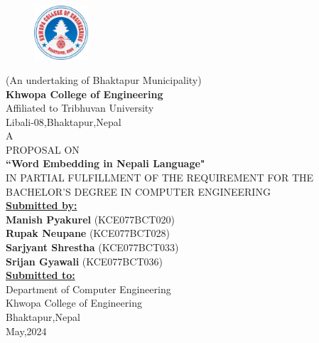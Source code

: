     \begin{center}
		\thispagestyle{empty}
        \begin{figure}[h!]
		    \centering
			    \includegraphics[width=0.18\textwidth]{img/khwopa logo.png}
		\end{figure}
         \normalsize(An undertaking of Bhaktapur Municipality)\\
         \Large\textbf{Khwopa College of Engineering}\\
         \normalsize Affiliated to Tribhuvan University\\
		\normalsize{{{Libali-08,Bhaktapur,Nepal}}\\[0.75cm]
		\large{A \\PROPOSAL ON\\\textbf{``Word Embedding in Nepali Language"}}\\\vspace{0.1in}
         \normalsize{IN PARTIAL FULFILLMENT OF THE REQUIREMENT
FOR THE BACHELOR’S DEGREE IN COMPUTER ENGINEERING} \\[0.65cm]
		
		
		
		\large\textbf{\underline{Submitted by:}}\\
		
	{\bf Manish Pyakurel} (KCE077BCT020)\\
	{\bf Rupak Neupane} (KCE077BCT028)\\
    {\bf Sarjyant Shrestha} (KCE077BCT033)\\
	{\bf Srijan Gyawali} (KCE077BCT036)\\[0.75cm]
    \large\textbf{\underline{Submitted to:}}\\
    \large Department of Computer Engineering\\
    \large Khwopa College of Engineering\\
    \large Bhaktapur,Nepal\\[0.75cm]
    \large{May,2024}
	}
    \end{center}
